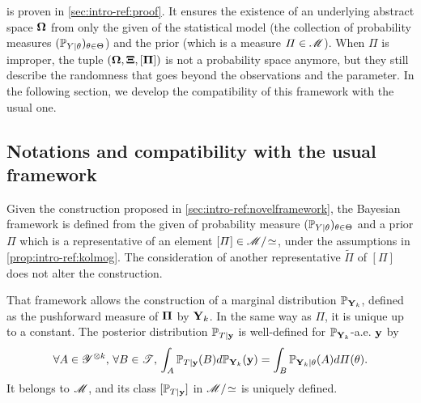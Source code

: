 
 is proven in \cref{sec:intro-ref:proof}. It ensures the existence of an underlying abstract space $\mathbf{\Omega}$
from only the given of the statistical model (the collection of probability measures $(\mathbb{P}_{Y|\theta})_{\theta\in\Theta}$) and the prior (which is a measure $\varPi\in\mathscr{M}$). When $\varPi$ is improper, the  tuple $(\mathbf{\Omega},\mathbf{\Xi},[\mathbf{\Pi}])$ is not a probability space anymore, %
but they still describe the randomness that goes beyond the observations and the parameter.
In the following section, we develop the compatibility of this framework with the usual one.











\subsection{Notations and compatibility with the usual framework}\label{sec:intro-ref:frameworkcompatibility}


Given the construction proposed in \cref{sec:intro-ref:novelframework}, the Bayesian framework is defined from the given of probability measure $(\mathbb{P}_{Y|\theta})_{\theta\in\Theta}$ and a prior $\varPi$ which is a representative of an element $[\varPi]\in\mathscr{M}/\!\simeq$, under the assumptions in \cref{prop:intro-ref:kolmog}.
The consideration of another representative $\tilde\varPi$ of  $[\varPi]$ does not alter the construction.



That framework allows the construction of a marginal distribution $\mathbb{P}_{\mathbf{Y}_k}$, defined as the pushforward measure of $\mathbf{\Pi}$ by $\mathbf{Y}_k$.
In the same way as $\varPi$, it is unique up to a constant.
The posterior distribution $\mathbb{P}_{T|\mathbf{y}}$ is well-defined for $\mathbb{P}_{\mathbf{Y}_k}$-a.e. $\mathbf{y}$ by
\begin{equation}
    \forall A\in\mathscr{Y}^{\otimes k},\,\forall B\in\mathscr{T},\, \int_{A}\mathbb{P}_{T|\mathbf{y}}(B)d\mathbb{P}_{\mathbf{Y}_k}(\mathbf{y}) = \int_B \mathbb{P}_{\mathbf{Y}_k|\theta}(A)d\varPi(\theta).
\end{equation}
It belongs to $\mathscr{M}$, and its class $[\mathbb{P}_{T|\mathbf{y}}]$  in $\mathscr{M}/\!\simeq$ is uniquely defined.


